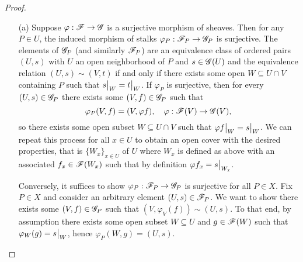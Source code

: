 \documentclass{article}
\begin{document}
\begin{enumerate} [label=\textbf{\arabic*.}, leftmargin=0em]
\begin{proof} $ $ \vspace{0pt}
    \begin{itemize} [leftmargin=0cm]
        \item[(a)] Suppose $\varphi : \mathscr{F} \to \mathscr{G}$ is a surjective morphism of sheaves. Then for any $P \in U$, the induced morphism of stalks $\varphi_P : \mathscr{F}_P \to \mathscr{G}_P$ is surjective.
        The elements of $\mathscr{G}_P$ (and similarly $\mathscr{F}_P$) are an equivalence class of ordered pairs $(U, s)$ with $U$ an open neighborhood of $P$ and $s \in \mathscr{G}(U)$ and the equivalence relation $(U, s) \sim (V, t)$ if and only if there exists some open $W \subseteq U \cap V$ containing $P$ such that $\restr{s}{W} = \restr{t}{W}$. If $\varphi_P$ is surjective, then for every $(U, s) \in \mathscr{G}_P$ there exists some $(V, f) \in \mathscr{G}_P$ such that
        \begin{equation*}
            \varphi_P(V, f) = (V, \varphi  f), \quad \varphi : \mathscr{F}(V) \to \mathscr{G}(V),
        \end{equation*}
        so there exists some open subset $W \subseteq U \cap V$ such that $\restr{\varphi f}{W} = \restr{s}{W}$.
        We can repeat this process for all $x \in U$ to obtain an open cover with the desired properties, that is $\{ W_x \}_{x \in U}$ of $U$ where $W_x$ is defined as above with an associated $f_x \in \mathscr{F}(W_x)$ such that by definition $\varphi f_x = \restr{s}{W_x}$.

        Conversely, it suffices to show $\varphi_P : \mathscr{F}_P \to \mathscr{G}_P$ is surjective for all $P \in X$.
        Fix $P \in X$ and consider an arbitrary element $(U, s) \in \mathscr{F}_P$.
        We want to show there exists some $(V, f) \in \mathscr{G}_P$ such that $(V, \varphi_V(f)) \sim (U, s)$.
        To that end, by assumption there exists some open subset $W \subseteq U$ and $g \in \mathscr{F}(W)$ such that $\varphi_W(g) = \restr{s}{W}$, hence $\varphi_P(W, g) = (U, s)$.


\end{itemize}
\end{proof}
\end{enumerate}
\end{document}
